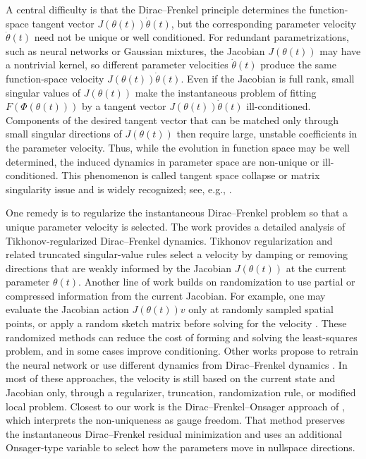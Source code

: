 \documentclass[oneside,11pt]{article}
\theoremstyle{remark}
\theoremstyle{thmstyleone}
\theoremstyle{thmstylethree}
\theoremstyle{thmstyletwo}
\begin{document}
A central difficulty is that the Dirac--Frenkel principle determines the function-space tangent vector $J(\theta(t))\dot\theta(t)$, but the corresponding parameter velocity $\dot\theta(t)$ need not be unique or well conditioned. For redundant parametrizations, such as neural networks or Gaussian mixtures, the Jacobian $J(\theta(t))$ may have a nontrivial kernel, so different parameter velocities $\dot{\theta}(t)$ produce the same function-space velocity $J(\theta(t))\dot{\theta}(t)$. Even if the Jacobian is full rank, small singular values of $J(\theta(t))$ make the instantaneous problem of fitting $F(\Phi(\theta(t)))$ by a tangent vector $J(\theta(t))\dot\theta(t)$ ill-conditioned. Components of the desired tangent vector that can be matched only through small singular directions of $J(\theta(t))$ then require large, unstable coefficients in the parameter velocity. Thus, while the evolution in function space may be well determined,  the induced dynamics in parameter space are non-unique or ill-conditioned. This phenomenon is called tangent space collapse \cite{24OTDDTO} or matrix singularity issue \cite{KAY1989165} and is widely recognized; see, e.g., \cite{9073ba01-c8c8-3f30-b15c-e4b52a44e9da,berman2023randomized,finzi_stable_2023,Feischl2024,pmlr-v235-chen24ad}.

One remedy is to regularize the instantaneous Dirac--Frenkel problem so that a unique parameter velocity is selected.  The work \cite{Feischl2024} provides a detailed analysis of Tikhonov-regularized Dirac--Frenkel dynamics. Tikhonov regularization and related truncated singular-value rules select a velocity by damping or removing directions that are weakly informed by the Jacobian $J(\theta(t))$ at the current parameter $\theta(t)$. Another line of work builds on randomization to use partial or compressed information from the current Jacobian. For example, one may evaluate the Jacobian action $J(\theta(t))v$ only
at randomly sampled spatial points, or apply a random sketch matrix before solving for the velocity \cite{berman2023randomized,lam2024randomizedlowrankrungekuttamethods,dong2025randomizedtimesteppingnonlinearly,CARREL2026114421}.
These randomized methods can reduce the cost of forming and solving the least-squares problem, and in some cases improve conditioning.
Other works propose to retrain the neural network \cite{finzi_stable_2023} or use different dynamics from Dirac--Frenkel dynamics \cite{kvaal2023need,pmlr-v202-chen23af,24OTDDTO,pmlr-v235-chen24ad}. In most of these approaches, the velocity is still based on the current state and Jacobian only, through a regularizer, truncation, randomization rule, or modified local problem.
Closest to our work is the Dirac--Frenkel--Onsager approach of \cite{RP26DFO}, which interprets the non-uniqueness as gauge freedom. That method preserves the instantaneous Dirac--Frenkel residual minimization and uses an additional Onsager-type variable to select how the parameters move in nullspace directions.
\end{document}
